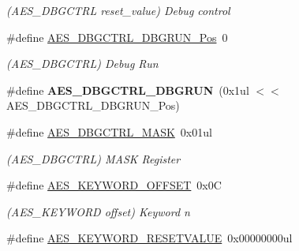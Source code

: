 \begin{DoxyCompactItemize}
\begin{DoxyCompactList}\small\item\em (A\+E\+S\+\_\+\+D\+B\+G\+C\+T\+R\+L reset\+\_\+value) Debug control \end{DoxyCompactList}\item 
\hypertarget{group___s_a_m_l21___a_e_s_gab28725525ff73bde31c6d28b588ba0d0}{}\#define \hyperlink{group___s_a_m_l21___a_e_s_gab28725525ff73bde31c6d28b588ba0d0}{A\+E\+S\+\_\+\+D\+B\+G\+C\+T\+R\+L\+\_\+\+D\+B\+G\+R\+U\+N\+\_\+\+Pos}~0\label{group___s_a_m_l21___a_e_s_gab28725525ff73bde31c6d28b588ba0d0}

\begin{DoxyCompactList}\small\item\em (A\+E\+S\+\_\+\+D\+B\+G\+C\+T\+R\+L) Debug Run \end{DoxyCompactList}\item 
\hypertarget{group___s_a_m_l21___a_e_s_ga7971d87d5a58292b4ac3dd7950cdc254}{}\#define {\bfseries A\+E\+S\+\_\+\+D\+B\+G\+C\+T\+R\+L\+\_\+\+D\+B\+G\+R\+U\+N}~(0x1ul $<$$<$ A\+E\+S\+\_\+\+D\+B\+G\+C\+T\+R\+L\+\_\+\+D\+B\+G\+R\+U\+N\+\_\+\+Pos)\label{group___s_a_m_l21___a_e_s_ga7971d87d5a58292b4ac3dd7950cdc254}

\item 
\hypertarget{group___s_a_m_l21___a_e_s_gae63e1673c0101507547e6ae1571013d0}{}\#define \hyperlink{group___s_a_m_l21___a_e_s_gae63e1673c0101507547e6ae1571013d0}{A\+E\+S\+\_\+\+D\+B\+G\+C\+T\+R\+L\+\_\+\+M\+A\+S\+K}~0x01ul\label{group___s_a_m_l21___a_e_s_gae63e1673c0101507547e6ae1571013d0}

\begin{DoxyCompactList}\small\item\em (A\+E\+S\+\_\+\+D\+B\+G\+C\+T\+R\+L) M\+A\+S\+K Register \end{DoxyCompactList}\item 
\hypertarget{group___s_a_m_l21___a_e_s_gad43961e3649400d0297ac0bf45f66b51}{}\#define \hyperlink{group___s_a_m_l21___a_e_s_gad43961e3649400d0297ac0bf45f66b51}{A\+E\+S\+\_\+\+K\+E\+Y\+W\+O\+R\+D\+\_\+\+O\+F\+F\+S\+E\+T}~0x0\+C\label{group___s_a_m_l21___a_e_s_gad43961e3649400d0297ac0bf45f66b51}

\begin{DoxyCompactList}\small\item\em (A\+E\+S\+\_\+\+K\+E\+Y\+W\+O\+R\+D offset) Keyword n \end{DoxyCompactList}\item 
\hypertarget{group___s_a_m_l21___a_e_s_ga1230f0ffc6944df9a46528ed89a81833}{}\#define \hyperlink{group___s_a_m_l21___a_e_s_ga1230f0ffc6944df9a46528ed89a81833}{A\+E\+S\+\_\+\+K\+E\+Y\+W\+O\+R\+D\+\_\+\+R\+E\+S\+E\+T\+V\+A\+L\+U\+E}~0x00000000ul\label{group___s_a_m_l21___a_e_s_ga1230f0ffc6944df9a46528ed89a81833}


\end{DoxyCompactItemize}
